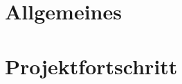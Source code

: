 \documentclass[a4paper,12pt,fleqn]{article}
\begin{document}
\setlength{\headheight}{36pt}

\begin{titlepage}



\end{titlepage}

\section[Allgemeines]{Allgemeines}
%
\section[Fortschritt]{Projektfortschritt}
%
%
\end{document}
